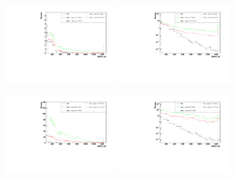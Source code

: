 \begin{figure}[h]
  \begin{center}
	\includegraphics[width=0.45\textwidth]{Plots/aQGC_kinematics/lepton_pt_FM7.pdf}%
	\includegraphics[width=0.45\textwidth]{Plots/aQGC_kinematics/lepton_pt_FM7_log.pdf}\\				
    \caption{}
  \end{center}
\end{figure}

\begin{figure}[h]
  \begin{center}
	\includegraphics[width=0.45\textwidth]{Plots/aQGC_kinematics/lepton_pt_FS0.pdf}%
	\includegraphics[width=0.45\textwidth]{Plots/aQGC_kinematics/lepton_pt_FS0_log.pdf}\\				
    \caption{}
  \end{center}
\end{figure}

